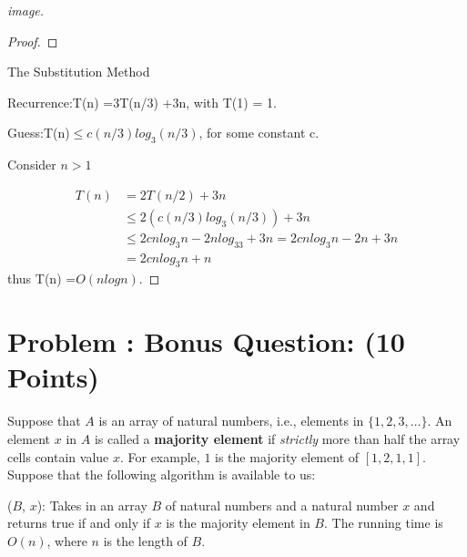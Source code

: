 \documentclass[12pt]{amsart}
\newcounter{pNum}
\newcommand{\problem}[2]{\addtocounter{pNum}{1}
\section*{Problem \arabic{pNum}: #1 (#2 Points)}}
\begin{document}
\begin{enumerate}[(a)]
\begin{proof}[image]
\begin{proof}
\end{proof}
The Substitution Method

Recurrence:T(n) =3T(n/3) +3n, with T(1) = 1.

Guess:T(n)$\leq c(n/3)log_3(n/3)$, for some constant c.

Consider $n > 1$

\begin{align*}
T(n) &= 2T(n/2)+3n\\
&\leq 2(c(n/3)log_3(n/3)) + 3n\\
&\leq 2cnlog_3n - 2nlog_33 + 3n = 2cnlog_3n - 2n + 3n \\
&=  2cnlog_3n +n
\end{align*}
thus T(n) =$O(nlogn).$


\end{proof}


\end{enumerate}

\newpage

\problem{Bonus Question:}{10}

Suppose that $A$ is an array of natural numbers, i.e., elements in $\{1,2,3,\ldots\}$. 
An element $x$ in $A$ is called a \textbf{majority element} if \textit{strictly} more than half the array cells contain value $x$. For example, $1$ is the majority element of $[1,2,1,1]$. Suppose that the following algorithm is available to us:

\smallskip
\isMajElement($B$, $x$): Takes in an array $B$ of natural numbers and a natural number $x$ and returns true if and only if $x$ is the majority element in $B$. 
The running time is $O(n)$, where $n$ is the length of $B$.
\end{document}
